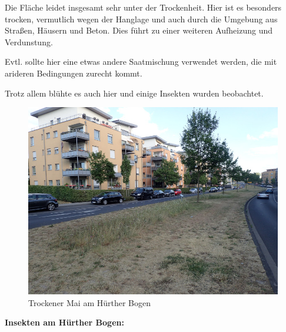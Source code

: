 \documentclass[10pt]{article}
\begin{document}
Die Fläche leidet insgesamt sehr unter der Trockenheit.
Hier ist es besonders trocken, vermutlich wegen der Hanglage und auch durch die Umgebung aus Straßen, Häusern und Beton. Dies führt zu einer weiteren Aufheizung und Verdunstung.

Evtl. sollte hier eine etwas andere Saatmischung verwendet werden, die mit arideren Bedingungen zurecht kommt.

Trotz allem blühte es auch hier und einige Insekten wurden beobachtet. 

\begin{figure}[h!]
  \centering
  \includegraphics[width=0.45\linewidth]{img/bogen/mai.jpg}
  \caption{Trockener Mai am Hürther Bogen}
\end{figure}


\clearpage
\textbf{Insekten am Hürther Bogen:}
\end{document}
